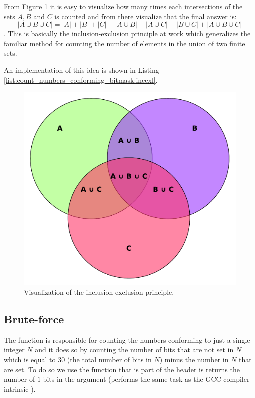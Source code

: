 From Figure \ref{fig:count_numbers_conforming_bitmask:sets} it is easy to visualize how many times each intersections of the sets $A,B$ and $C$ is counted and from there visualize that the final answer is:
$$ |A \cup B \cup C| = |A|+|B|+|C| - |A \cup B| - |A \cup C| - |B \cup C| + |A \cup B \cup C|$$. 
This is basically the inclusion-exclusion principle at work which generalizes the familiar method for counting the number of elements in the union of two finite sets.


An implementation of this idea is shown in Listing \ref{list:count_numbers_conforming_bitmask:incexl}.

\begin{figure}
    \centering
    \includegraphics[width=\textwidth]{sources/count_numbers_conforming_bitmask/images/sets}
    \caption[]{Visualization of the inclusion-exclusion principle.}
    \label{fig:count_numbers_conforming_bitmask:sets}
\end{figure}

\subsection{Brute-force}
\label{count_numbers_conforming_bitmask:sec:bruteforce}



The function  is responsible for counting the numbers conforming to just a single integer $N$ and it does so by counting the number of bits that are not set in $N$ which is equal to $30$ (the total number of bits in $N$) minus the number in $N$ that are set. To do so we use the function  that is part of the  header is returns the number of $1$ bits in the argument (performs the same task as the GCC compiler intrinsic ).

